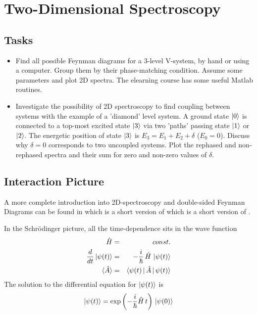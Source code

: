 \chapter{Two-Dimensional Spectroscopy}


\section{Tasks}

\begin{itemize}
\item Find all possible Feynman diagrams for a 3-level V-system, by hand or using a computer. Group them by their phase-matching condition. Assume some parameters and plot 2D spectra. The elearning course has some useful Matlab routines.

\item Investigate the possibility of 2D spectroscopy to find coupling between systems with the example of a 'diamond' level system. A ground state $\ket{0}$ is connected to a top-most excited state $\ket{3}$ via two 'paths' passing state $\ket{1}$ or $\ket{2}$. The energetic position of state $\ket{3}$ is $E_3 = E_1 + E_2 + \delta$ ($E_0= 0$). Discuss why $\delta = 0$ corresponds to two uncoupled systems. Plot the rephased and non-rephased spectra and their sum for zero and non-zero values of $\delta$.


\end{itemize}

\section{Interaction Picture}

A more complete introduction into 2D-spectroscopy and double-sided Feynman Diagrams can be found in \cite{Hamm-dummies} which is a short version of \cite{HammZanni2011} which is a short version of \cite{Mukamel1995}.


In the Schrödinger picture, all the time-dependence sits in the wave function
\begin{eqnarray}
 \hat{H} & = & const. \\
 \frac{d}{dt} \ket{\psi(t)} &=& - \frac{i}{\hbar} \, \hat{H} \, \ket{\psi(t)} \\
 \braket{\hat{A}} &=& \braket{\psi(t) \, | \,\hat{A} \, |\, \psi(t) } 
\end{eqnarray}
The solution to the differential equation for $\ket{\psi(t)}$ is
\begin{equation}
 \ket{\psi(t)} =  \exp \left(- \frac{i}{\hbar} \hat{H} \, t \right) \,\ket{\psi(0)} 
\end{equation}


